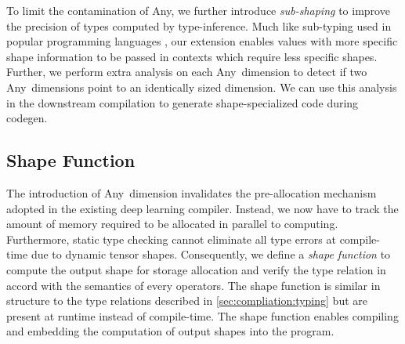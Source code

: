         To limit the contamination of Any, we further introduce {\em sub-shaping} to improve the precision of types computed by type-inference.
        Much like sub-typing used in popular programming languages \citep{LiskovTPLS1994,AmadioAmadioTPLS1993}, our extension enables values with more specific shape information to be passed in contexts which require less specific shapes.
        Further, we perform extra analysis on each Any~dimension to detect if two Any~dimensions point to an identically sized dimension. We can use this analysis in the downstream compilation to generate shape-specialized code during codegen.

        \subsection{Shape Function}
        \label{sec:compilation:shape-func}
        The introduction of Any~dimension invalidates the pre-allocation mechanism adopted in the existing deep learning compiler.
        Instead, we now have to track the amount of memory required to be allocated in parallel to computing.
        Furthermore, static type checking cannot eliminate all type errors at compile-time due to dynamic tensor shapes.
        Consequently, we define a {\em shape function} to compute the output shape for storage allocation and verify the type relation in accord with the semantics of every operators.
        The shape function is similar in structure to the type relations described in \autoref{sec:compliation:typing} but are present at runtime instead of compile-time.
        The shape function enables compiling and embedding the computation of output shapes into the program.

